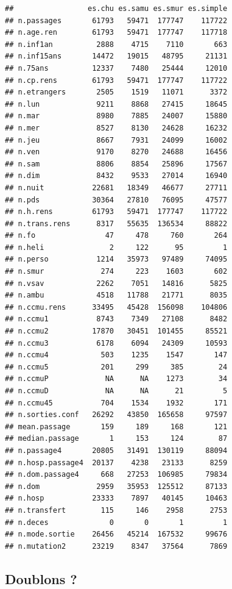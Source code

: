 \documentclass[]{article}
\begin{document}
\begin{verbatim}
##                 es.chu es.samu es.smur es.simple
## n.passages       61793   59471  177747    117722
## n.age.ren        61793   59471  177747    117718
## n.inf1an          2888    4715    7110       663
## n.inf15ans       14472   19015   48795     21131
## n.75ans          12337    7480   25444     12010
## n.cp.rens        61793   59471  177747    117722
## n.etrangers       2505    1519   11071      3372
## n.lun             9211    8868   27415     18645
## n.mar             8980    7885   24007     15880
## n.mer             8527    8130   24628     16232
## n.jeu             8667    7931   24099     16002
## n.ven             9170    8270   24688     16456
## n.sam             8806    8854   25896     17567
## n.dim             8432    9533   27014     16940
## n.nuit           22681   18349   46677     27711
## n.pds            30364   27810   76095     47577
## n.h.rens         61793   59471  177747    117722
## n.trans.rens      8317   55635  136534     88822
## n.fo                47     478     760       264
## n.heli               2     122      95         1
## n.perso           1214   35973   97489     74095
## n.smur             274     223    1603       602
## n.vsav            2262    7051   14816      5825
## n.ambu            4518   11788   21771      8035
## n.ccmu.rens      33495   45428  156098    104806
## n.ccmu1           8743    7349   27108      8482
## n.ccmu2          17870   30451  101455     85521
## n.ccmu3           6178    6094   24309     10593
## n.ccmu4            503    1235    1547       147
## n.ccmu5            201     299     385        24
## n.ccmuP             NA      NA    1273        34
## n.ccmuD             NA      NA      21         5
## n.ccmu45           704    1534    1932       171
## n.sorties.conf   26292   43850  165658     97597
## mean.passage       159     189     168       121
## median.passage       1     153     124        87
## n.passage4       20805   31491  130119     88094
## n.hosp.passage4  20137    4238   23133      8259
## n.dom.passage4     668   27253  106985     79834
## n.dom             2959   35953  125512     87133
## n.hosp           23333    7897   40145     10463
## n.transfert        115     146    2958      2753
## n.deces              0       0       1         1
## n.mode.sortie    26456   45214  167532     99676
## n.mutation2      23219    8347   37564      7869
\end{verbatim}

\subsection{Doublons ?}\label{doublons}
\end{document}
